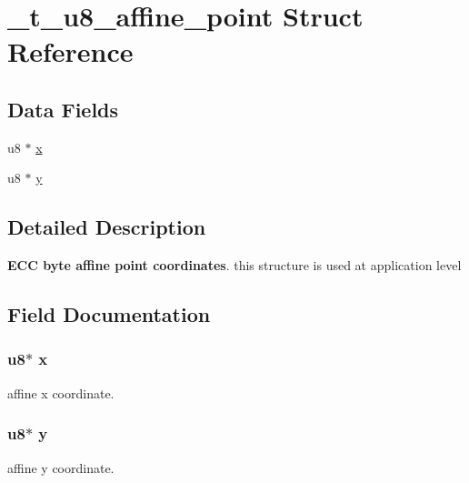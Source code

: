 \hypertarget{struct__t__u8__affine__point}{\section{\+\_\+t\+\_\+u8\+\_\+affine\+\_\+point Struct Reference}
\label{struct__t__u8__affine__point}
}
\subsection*{Data Fields}
\begin{DoxyCompactItemize}
\item 
u8 $\ast$ \hyperlink{struct__t__u8__affine__point_a491ceb5dc35f494dc4f3404d310efdce}{x}
\item 
u8 $\ast$ \hyperlink{struct__t__u8__affine__point_a6e7899d61e302b5db66be4db664372b0}{y}
\end{DoxyCompactItemize}


\subsection{Detailed Description}
{\bfseries E\+C\+C byte affine point coordinates}. this structure is used at application level 

\subsection{Field Documentation}
\hypertarget{struct__t__u8__affine__point_a491ceb5dc35f494dc4f3404d310efdce}{
\subsubsection[{x}]{\setlength{\rightskip}{0pt plus 5cm}u8$\ast$ x}}\label{struct__t__u8__affine__point_a491ceb5dc35f494dc4f3404d310efdce}
affine x coordinate. \hypertarget{struct__t__u8__affine__point_a6e7899d61e302b5db66be4db664372b0}{
\subsubsection[{y}]{\setlength{\rightskip}{0pt plus 5cm}u8$\ast$ y}}\label{struct__t__u8__affine__point_a6e7899d61e302b5db66be4db664372b0}
affine y coordinate. 